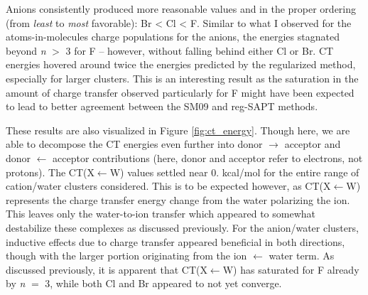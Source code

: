 \begin{sie}
  Anions consistently produced more reasonable values and in the proper ordering (from \emph{least} to \emph{most} favorable): Br\sur{-} < 
  Cl\sur{-} < F\sur{-}. Similar to what I observed for the atoms-in-molecules charge populations for the anions, the energies stagnated beyond
  \emph{n} $>$ 3 for F\sur{-} -- however, without falling behind either Cl\sur{-} or Br\sur{-}. CT energies hovered around
  twice the energies predicted by the regularized method, especially for larger clusters. This is an interesting result as the saturation in 
  the amount of charge transfer observed particularly for F\sur{-} might have been expected to lead to better agreement between the SM09 and
  reg-SAPT methods.

  These results are also visualized in Figure \ref{fig:ct_energy}. Though here, we are able to decompose the CT energies even further into 
  donor $\rightarrow$ acceptor and donor $\leftarrow$ acceptor contributions (here, donor and acceptor refer to electrons, not 
  protons)\cite{jeziorski1994sapt}. The CT(X$\leftarrow$W) values settled near 0. kcal/mol for the entire range of cation/water clusters
  considered. This is to be expected however, as CT(X$\leftarrow$W) represents the charge transfer energy change from the water polarizing
  the ion. This leaves only the water-to-ion transfer which appeared to somewhat destabilize these complexes as discussed previously. For the
  anion/water clusters, inductive effects due to charge transfer appeared beneficial in both directions, though with the larger 
  portion originating from the ion $\leftarrow$ water term. As discussed previously, it is apparent that CT(X$\leftarrow$W) has saturated 
  for F\sur{-} already by \emph{n} $=$ 3, while both Cl\sur{-} and Br\sur{-} appeared to not yet converge.
  

\end{sie}
